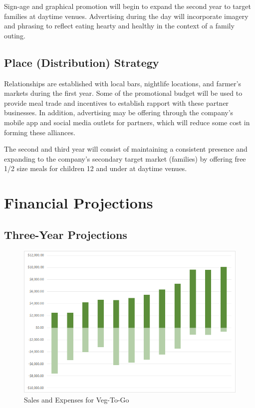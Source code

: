 \documentclass[12pt, letterpaper]{article}
\newcommand{\companyname}{Veg-To-Go}
\begin{document}
Sign-age and graphical promotion will begin to expand the second year to target families at daytime venues.  Advertising during the day will incorporate imagery and phrasing to reflect eating hearty and healthy in the context of a family outing.
\subsection{Place (Distribution) Strategy}
Relationships are established with local bars, nightlife locations, and farmer's markets during the first year.  Some of the promotional budget will be used to provide meal trade and incentives to establish rapport with these partner businesses.  In addition, advertising may be offering through the company's mobile app and social media outlets for partners, which will reduce some cost in forming these alliances.

The second and third year will consist of maintaining a consistent presence and expanding to the company's secondary target market (families) by offering free 1/2 size meals for children 12 and under at daytime venues.

\section{Financial Projections}
\subsection{Three-Year Projections}

\begin{figure}[H]
	\caption{Sales and Expenses for \companyname{}}
	\includegraphics[width=\textwidth]{SalesAndExpenses}
\end{figure}
\end{document}
